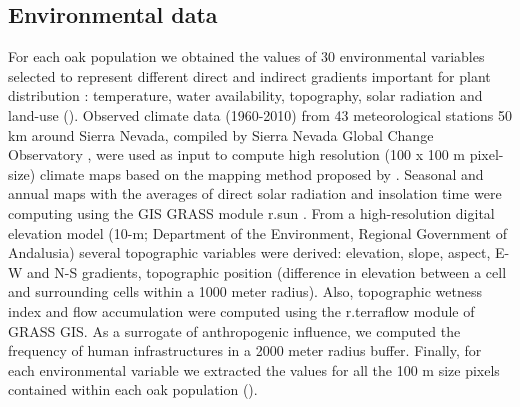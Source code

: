 \subsection{Environmental data}\label{sec:multivar:EnvData}
For each oak population we obtained the values of 30 environmental variables selected to represent different direct and indirect gradients important for plant distribution \autocite{GuisanZimmermann2000PredictiveHabitat,Williamsetal2012WhichEnvironmental}: temperature, water availability, topography, solar radiation and land-use (). Observed climate data (1960-2010) from 43 meteorological stations 50 km around Sierra Nevada, compiled by Sierra Nevada Global Change Observatory \autocite{Zamoraetal2017GlobalChange}, were used as input to compute high resolution (100 x 100 m pixel-size) climate maps \autocite{Benitoetal2014ClimateSimulations} based on the mapping method proposed by \textcite{Ninyerolaetal2000MethodologicalApproach}. Seasonal and annual maps with the averages of direct solar radiation and insolation time were computing using the GIS GRASS module r.sun \autocite{Neteleretal2012GRASSGIS,SuriHofierka2004NewGISbased}. From a high-resolution digital elevation model (10-m; Department of the Environment, Regional Government of Andalusia) several topographic variables were derived: elevation, slope, aspect, E-W and N-S gradients, topographic position (difference in elevation between a cell and surrounding cells within a 1000 meter radius)\autocite{Guisanetal1999GLMCCA}. Also, topographic wetness index and flow accumulation were computed using the r.terraflow module of GRASS GIS. As a surrogate of anthropogenic influence, we computed the frequency of human infrastructures in a 2000 meter radius buffer. Finally, for each environmental variable we extracted the values for all the 100 m size pixels contained within each oak population ().

\newcommand{\Whm}{\(\mathrm{W \cdot h \cdot m^{-2}}\)}

